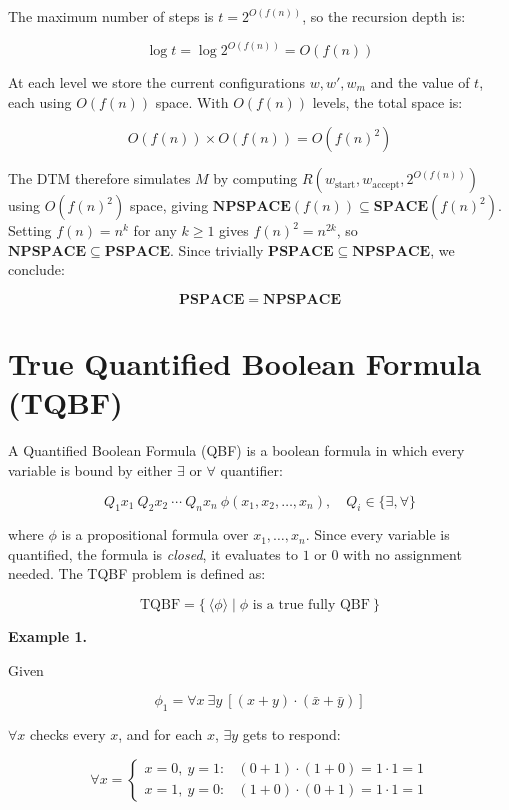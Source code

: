 \documentclass[12pt,a4paper,openany]{article}
\begin{document}
The maximum number of steps is $t = 2^{O(f(n))}$, so the recursion depth is:

\[
\log t = \log 2^{O(f(n))} = O(f(n))
\]

At each level we store the current configurations $w, w', w_m$ and the value of $t$,
each using $O(f(n))$ space. With $O(f(n))$ levels, the total space is:

\[
O(f(n)) \times O(f(n)) = O(f(n)^2)
\]

The DTM therefore simulates $M$ by computing
$R(w_{\mathrm{start}}, w_{\mathrm{accept}}, 2^{O(f(n))})$
using $O(f(n)^2)$ space, giving $\mathbf{NPSPACE}(f(n)) \subseteq \mathbf{SPACE}(f(n)^2)$.
Setting $f(n) = n^k$ for any $k \geq 1$ gives $f(n)^2 = n^{2k}$, so
$\mathbf{NPSPACE}\subseteq \mathbf{PSPACE}$. Since trivially $\mathbf{PSPACE} \subseteq
\mathbf{NPSPACE}$, we conclude:

\[
\mathbf{PSPACE} = \mathbf{NPSPACE}
\]

\section{True Quantified Boolean Formula (TQBF)}

A Quantified Boolean Formula (QBF) is a boolean formula in which 
every variable is bound by either $\exists$ or $\forall$ quantifier:

\[
Q_1 x_1\ Q_2 x_2\ \cdots\ Q_n x_n\ \phi(x_1, x_2, \ldots, x_n), 
\quad Q_i \in \{\exists, \forall\}
\]

where $\phi$ is a propositional formula over $x_1, \ldots, x_n$. Since every 
variable is quantified, the formula is \emph{closed}, it evaluates to 
$1$ or $0$ with no assignment needed. The TQBF problem is defined as:

\[
\mathrm{TQBF} = \{\ \langle \phi \rangle \mid \phi \text{ is a true fully QBF}\ \}
\]

\textbf{Example 1.}

Given

\[
\phi_1 = \forall x\ \exists y\ [(x + y) \cdot (\bar{x} + \bar{y})]
\]

$\forall x$ checks every $x$, and for each $x$, $\exists y$ gets to respond:

\[
\forall x = \begin{cases}
x = 0,\ y = 1: & (0 + 1) \cdot (1 + 0) = 1 \cdot 1 = 1  \\
x = 1,\ y = 0: & (1 + 0) \cdot (0 + 1) = 1 \cdot 1 = 1 
\end{cases}
\]
\end{document}
